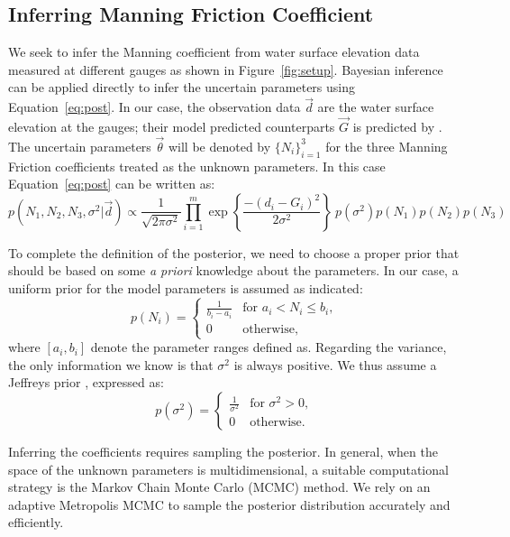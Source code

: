 \subsection{Inferring Manning Friction Coefficient}
 \label{sec:manning}
 
We seek to infer the Manning coefficient from water surface elevation
data measured at different gauges as shown in Figure~\ref{fig:setup}.
Bayesian inference can be applied directly to infer the uncertain parameters
using Equation~\eqref{eq:post}. In our case, the observation data $\vec d$ 
are the water surface elevation at the gauges;
their model predicted counterparts $\vec G$ is predicted by \geoclaw.
The uncertain parameters $\vec \theta$ will be denoted by $\{N_i\}_{i=1}^3$ for the
three Manning Friction coefficients treated as the unknown parameters. 
In this case  Equation~\eqref{eq:post} can be written as:
\begin{equation} 
p(N_1,N_2,N_3,\sigma^2 | \vec d) 
\propto \frac{1}{\sqrt{2 \pi \sigma^2}} 
 \prod_{i=1}^m  
\exp \left\lbrace \frac{-(d_i - G_i)^2}{2 \sigma^2} \right\rbrace
\ p(\sigma^2)p(N_1)p(N_2) p(N_3)
\label{eq:post_coef}
\end{equation}

To complete the definition of the posterior, we need to choose a proper prior that should be based 
on some \emph{a priori} knowledge about the parameters. In our case, a uniform
prior for the model parameters is assumed as indicated:
\begin{equation} 
p(N_i) = \begin{cases}
		\displaystyle \frac{1}{b_i-a_i} &\text{for~} a_i <  N_i \leq b_i ,  \\
		0 &\text{otherwise}  , 
\end{cases}
\end{equation}
where $ [a_i,b_i]$ denote the parameter ranges defined as.
Regarding the variance, the only information we know 
is that $\sigma^2$ is always positive.
We thus assume a Jeffreys prior \citep{sivia}, expressed as:
\begin{equation} 
p(\sigma^2) =  \begin{cases}
		\displaystyle \frac{1}{\sigma^2} &\text{for~} \sigma^2 > 0,  \\
		0 &\text{otherwise}. 
		\end{cases}
\label{eq:var_pr}
\end{equation}

Inferring the coefficients requires 
sampling the posterior. In general, when the space of the unknown 
parameters is multidimensional, a suitable computational strategy is 
the Markov Chain Monte  Carlo (MCMC) method. 
We rely on an adaptive Metropolis MCMC \citep{Gareth2009,Haario2001} to
sample the posterior distribution accurately and efficiently.


